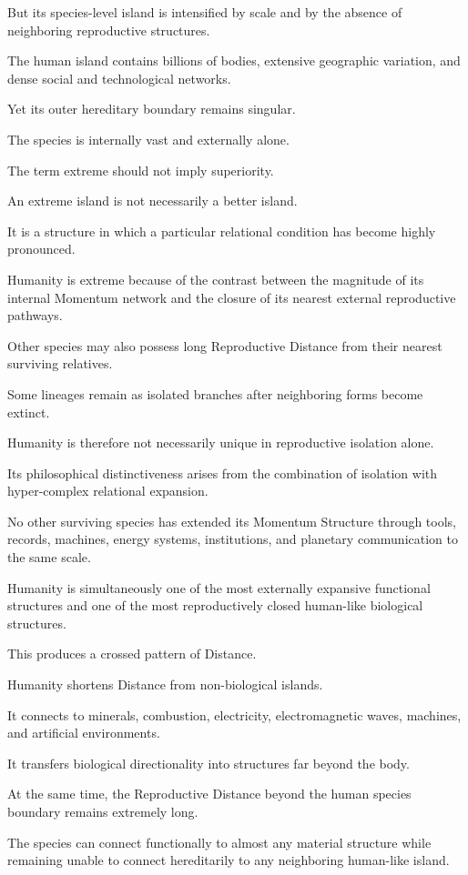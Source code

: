 But its species-level island is intensified by scale and by the absence of neighboring reproductive structures.

The human island contains billions of bodies, extensive geographic variation, and dense social and technological networks.

Yet its outer hereditary boundary remains singular.

The species is internally vast and externally alone.

The term extreme should not imply superiority.

An extreme island is not necessarily a better island.

It is a structure in which a particular relational condition has become highly pronounced.

Humanity is extreme because of the contrast between the magnitude of its internal Momentum network and the closure of its nearest external reproductive pathways.

Other species may also possess long Reproductive Distance from their nearest surviving relatives.

Some lineages remain as isolated branches after neighboring forms become extinct.

Humanity is therefore not necessarily unique in reproductive isolation alone.

Its philosophical distinctiveness arises from the combination of isolation with hyper-complex relational expansion.

No other surviving species has extended its Momentum Structure through tools, records, machines, energy systems, institutions, and planetary communication to the same scale.

Humanity is simultaneously one of the most externally expansive functional structures and one of the most reproductively closed human-like biological structures.

This produces a crossed pattern of Distance.

Humanity shortens Distance from non-biological islands.

It connects to minerals, combustion, electricity, electromagnetic waves, machines, and artificial environments.

It transfers biological directionality into structures far beyond the body.

At the same time, the Reproductive Distance beyond the human species boundary remains extremely long.

The species can connect functionally to almost any material structure while remaining unable to connect hereditarily to any neighboring human-like island.


